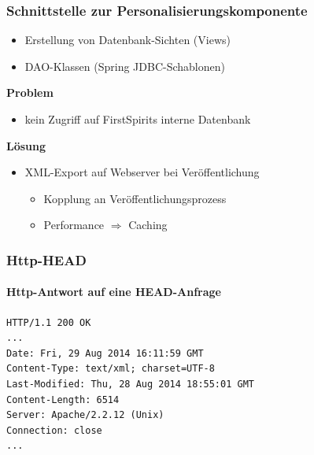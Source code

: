 \documentclass{beamer}
\begin{document}
\begin{frame}
\frametitle{Schnittstelle zur Personalisierungskomponente}

\begin{itemize}
  \item Erstellung von Datenbank-Sichten (Views)
  \item DAO-Klassen (Spring JDBC-Schablonen)
\end{itemize}  
  
  \textbf{Problem}
  \begin{itemize}
  \item kein Zugriff auf FirstSpirits interne Datenbank
  \end{itemize}
  
\textbf{Lösung}
  \begin{itemize}
    \item XML-Export auf Webserver bei Veröffentlichung
  \begin{itemize}
    \item Kopplung an Veröffentlichungsprozess
    \item Performance $\Rightarrow$ Caching
    \end{itemize}
\end{itemize}

\end{frame}

\begin{frame}[fragile]
\frametitle{Http-HEAD}
\framesubtitle{Http-Antwort auf eine HEAD-Anfrage}

\begin{lstlisting}[basicstyle=\ttfamily\scriptsize] 
HTTP/1.1 200 OK
...
Date: Fri, 29 Aug 2014 16:11:59 GMT
Content-Type: text/xml; charset=UTF-8
Last-Modified: Thu, 28 Aug 2014 18:55:01 GMT
Content-Length: 6514
Server: Apache/2.2.12 (Unix)
Connection: close
...
\end{lstlisting}

\end{frame}
\end{document}
